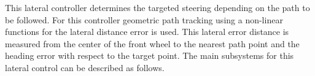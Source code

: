 \documentclass[11pt,letterpaper]{report}
\begin{document}
This lateral controller determines the targeted steering depending on
the path to be followed. For this controller geometric path tracking
using a non-linear functions for the lateral distance error is used.
This lateral error distance is measured from the center of the front
wheel to the nearest path point and the heading error with respect to
the target point. The main subsystems for this lateral control can be
described as follows.

\end{document}
